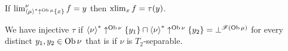 \begin{cor}
If $\lim_{\left\langle \mu\right\rangle ^{\ast}\uparrow^{\operatorname{Ob}\mu}\{x\}}^{\nu}f=y$ then $\operatorname{xlim}_{x}f=\tau(y)$.
\end{cor}
We have injective $\tau$ if $\left\langle \nu\right\rangle ^{\ast}\uparrow^{\operatorname{Ob}\nu}\{y_{1}\}\sqcap\left\langle \nu\right\rangle ^{\ast}\uparrow^{\operatorname{Ob}\nu}\{y_{2}\}=\bot^{\mathscr{F}(\operatorname{Ob}\mu)}$
for every distinct $y_{1},y_{2}\in\operatorname{Ob}\nu$ that is if $\nu$ is $T_{2}$-separable.
